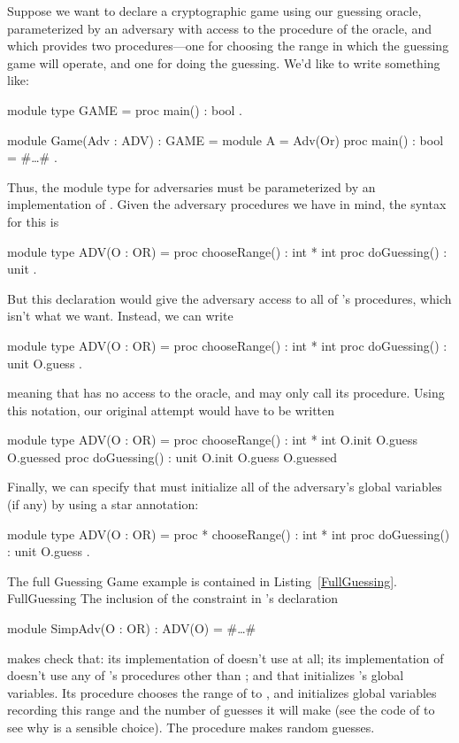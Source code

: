 Suppose we want to declare a cryptographic game using our guessing
oracle, parameterized by an adversary with access to the 
procedure of the oracle, and which provides two procedures---one
for choosing the range in which the guessing game will operate, and
one for doing the guessing.  We'd like to write something like:
\begin{easycrypt}{}{}
module type GAME = {
  proc main() : bool
}.

module Game(Adv : ADV) : GAME = {
  module A = Adv(Or)
  proc main() : bool = { #\ldots# }
}.
\end{easycrypt}
Thus, the module type  for adversaries must be parameterized
by an implementation of . Given the adversary procedures we have
in mind, the syntax for this is
\begin{easycrypt}{}{}
module type ADV(O : OR) = {
  proc chooseRange() : int * int
  proc doGuessing() : unit
}.
\end{easycrypt}
But this declaration would give the adversary access to all of 's
procedures, which isn't what we want. Instead, we can write
\begin{easycrypt}{}{}
module type ADV(O : OR) = {
  proc chooseRange() : int * int {}
  proc doGuessing() : unit {O.guess}
}.
\end{easycrypt}
meaning that  has no access to the oracle, and
 may only call its  procedure. Using
this notation, our original attempt would have to be written
\begin{easycrypt}{}{}
module type ADV(O : OR) = {
  proc chooseRange() : int * int {O.init O.guess O.guessed}
  proc doGuessing() : unit {O.init O.guess O.guessed}
}
\end{easycrypt}
Finally, we can specify that  must initialize
all of the adversary's global variables (if any) by using a
star annotation:
\begin{easycrypt}{}{}
module type ADV(O : OR) = {
  proc * chooseRange() : int * int {}
  proc doGuessing() : unit {O.guess}
}.
\end{easycrypt}

The full Guessing Game example is contained in Listing~\ref{FullGuessing}.
 {}{FullGuessing}
The inclusion of the constraint  in 's declaration
\begin{easycrypt}{}{}
module SimpAdv(O : OR) : ADV(O) = #\ldots#
\end{easycrypt}
makes \EasyCrypt check that: its implementation of 
doesn't use  at all; its implementation of 
doesn't use any of 's procedures other than ; and
that  initializes 's global variables.
Its  procedure chooses the range of  to ,
and initializes global variables recording this range and the
number of guesses it will make (see the code of  to see
why  is a sensible choice). The  procedure
makes  random guesses.

